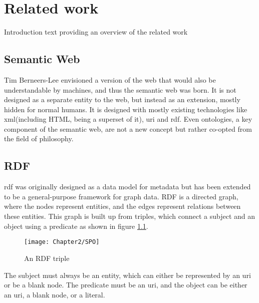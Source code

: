 
\chapter{Related work}
\label{chapter:related_work}

Introduction text providing an overview of the related work

\section{Semantic Web}
Tim Berneers-Lee envisioned a version of the web that would also be understandable by machines, and thus the semantic web was born. It is not designed as a separate entity to the web, but instead as an extension, mostly hidden for normal humans. It is designed with mostly existing technologies like \acrshort{xml}(including HTML, being a superset of it), \acrshort{uri} and \acrshort{rdf}. Even ontologies, a key component of the semantic web, are not a new concept but rather co-opted from the field of philosophy. \citep{thesemanticweb}

\section{RDF}
\acrshort{rdf} was originally designed as a data model for metadata but has been extended to be a general-purpose framework for graph data. RDF is a directed graph, where the nodes represent entities, and the edges represent relations between these entities. This graph is built up from triples, which connect a subject and an object using a predicate as shown in figure \ref{fig:rdf_triple}. 

\begin{figure}
    \centering
    \texttt{[image: Chapter2/SPO]}
    \caption{An RDF triple}
    \label{fig:rdf_triple}
\end{figure}

The subject must always be an entity, which can either be represented by an \acrshort{uri} or be a blank node. The predicate must be an \acrshort{uri}, and the object can be either an \acrshort{uri}, a blank node, or a literal. \citep{rdfprimer}

